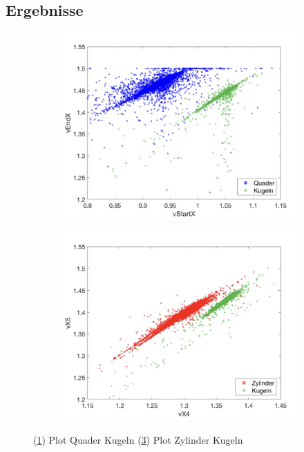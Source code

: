 \subsection{Ergebnisse}




\begin{figure}
    \centering
    \begin{subfigure}[b]{0.45\textwidth}
        \includegraphics[width=\textwidth]{pics/Plot_Quader-Kugeln.png}
        \caption{ }
        \label{fig:PlotQuaderKugeln}
    \end{subfigure}
    \qquad
    \begin{subfigure}[b]{0.45\textwidth}
        \includegraphics[width=\textwidth]{pics/Plot_Zylinder-Kugeln.png}
        \caption{ }
        \label{fig:PlotZylinderKugeln}
    \end{subfigure}
    \caption{(\ref{fig:PlotQuaderKugeln}) Plot Quader Kugeln (\ref{fig:PlotZylinderKugeln}) Plot Zylinder Kugeln}
\end{figure}


